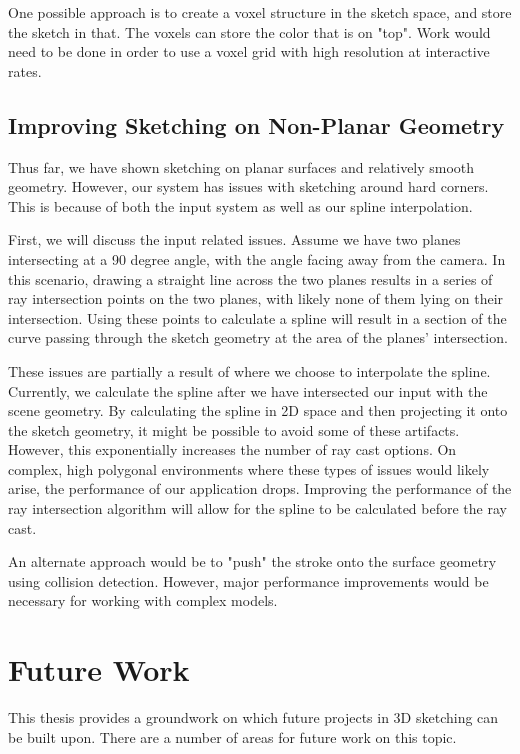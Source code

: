 One possible approach is to create a voxel structure in the sketch space, and store the sketch in that.
The voxels can store the color that is on "top".
Work would need to be done in order to use a voxel grid with high resolution at interactive rates.

\subsection{Improving Sketching on Non-Planar Geometry}

Thus far, we have shown sketching on planar surfaces and relatively smooth geometry.
However, our system has issues with sketching around hard corners.
This is because of both the input system as well as our spline interpolation.

First, we will discuss the input related issues.
Assume we have two planes intersecting at a 90 degree angle, with the angle facing away from the camera.
In this scenario, drawing a straight line across the two planes results in a series of ray intersection points on the two planes, with likely none of them lying on their intersection. 
Using these points to calculate a spline will result in a section of the curve passing through the sketch geometry at the area of the planes' intersection.

These issues are partially a result of where we choose to interpolate the spline.
Currently, we calculate the spline after we have intersected our input with the scene geometry.
By calculating the spline in 2D space and then projecting it onto the sketch geometry, it might be possible to avoid some of these artifacts.
However, this exponentially increases the number of ray cast options.
On complex, high polygonal environments where these types of issues would likely arise, the performance of our application drops.
Improving the performance of the ray intersection algorithm will allow for the spline to be calculated before the ray cast.

An alternate approach would be to "push" the stroke onto the surface geometry using collision detection.
However, major performance improvements would be necessary for working with complex models. 

\section{Future Work}

This thesis provides a groundwork on which future projects in 3D sketching can be built upon.
There are a number of areas for future work on this topic.

